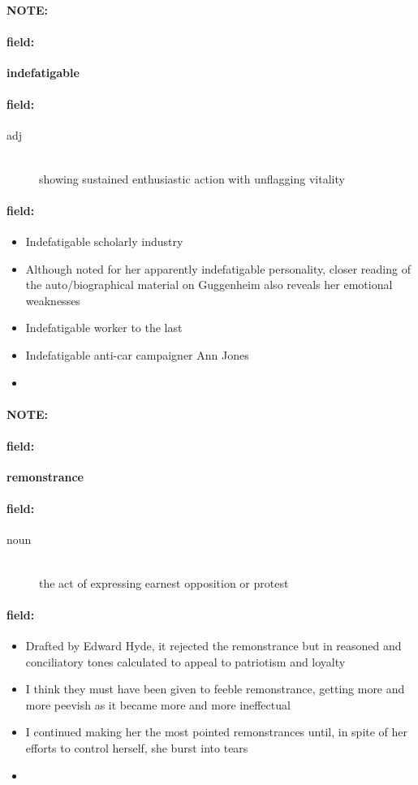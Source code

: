 \documentclass[12pt]{article}
\newenvironment{note}{\paragraph{NOTE:}}{}
\newenvironment{field}{\paragraph{field:}}{}
\begin{document}
\begin{note}
\begin{field}
\textbf{\large indefatigable}
\end{field}


\begin{field}
\begin{description}
\item[adj] \hfill \\ 
showing sustained enthusiastic action with unflagging vitality

\end{description}
\end{field}

\begin{field}
\begin{itemize}
\item Indefatigable scholarly industry
\item Although noted for her apparently indefatigable personality, closer reading of the auto/biographical material on Guggenheim also reveals her emotional weaknesses
\item Indefatigable worker to the last
\item Indefatigable anti-car campaigner Ann Jones
\item 
\end{itemize}
\end{field}
\end{note}
\begin{note}
\begin{field}
\textbf{\large remonstrance}
\end{field}


\begin{field}
\begin{description}
\item[noun] \hfill \\ 
the act of expressing earnest opposition or protest

\end{description}
\end{field}

\begin{field}
\begin{itemize}
\item Drafted by Edward Hyde, it rejected the remonstrance but in reasoned and conciliatory tones calculated to appeal to patriotism and loyalty
\item I think they must have been given to feeble remonstrance, getting more and more peevish as it became more and more ineffectual
\item I continued making her the most pointed remonstrances until, in spite of her efforts to control herself, she burst into tears
\item 
\end{itemize}
\end{field}
\end{note}
\end{document}
